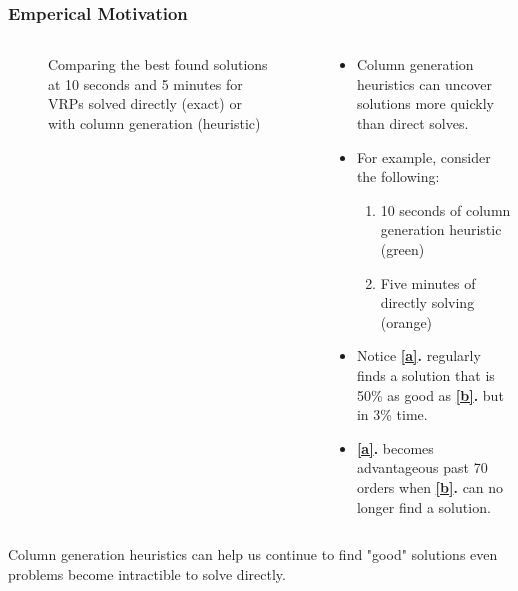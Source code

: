 \documentclass{beamer}
\begin{document}
	\begin{frame}[t]
		\frametitle{Emperical Motivation}
		\small
		\begin{columns}[T]
			\vspace{-1cm}
			\begin{column}{0.4\textwidth}
				\vspace{-.25cm}
				\begin{figure}[h]
					\caption{Comparing the best found solutions at 10 seconds and 5 minutes for VRPs solved directly (exact) or with column generation (heuristic)}
					\label{p:compare}
				\end{figure}
			\end{column}
			\begin{column}{0.6\textwidth}
				\begin{itemize}
					\item Column generation heuristics can uncover solutions more quickly than direct solves.
					\item For example, consider the following:
					\begin{enumerate}[\bf a.]
						\item 10 seconds of column generation heuristic (green) \label{a}
						\item Five minutes of directly solving (orange) \label{b}
					\end{enumerate}
					\item Notice \textbf{\ref{a}.} regularly finds a solution that is 50\% as good as \textbf{\ref{b}.} but in 3\% time.
					\item \textbf{\ref{a}.} becomes advantageous past 70 orders when \textbf{\ref{b}.} can no longer find a solution.
				\end{itemize}
			\end{column}
		\end{columns}
		\vspace{-.5cm}
		\begin{block}{}
			Column generation heuristics can help us continue to find "good" solutions even problems become intractible to solve directly.
		\end{block}
		\normalsize
	\end{frame}
\end{document}
